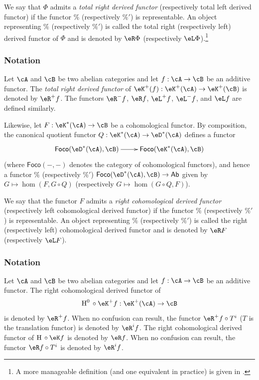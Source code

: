 \begin{definition}\label{VIII:4-1-2}
We say that $\Phi$ admits a \emph{total right derived functor}
(respectively total left derived functor) if the functor $\%$
(respectively $\%'$) is representable. An object representing $\%$
(respectively $\%'$) is called the total right (respectively left) derived
functor of $\Phi$ and is denoted by $\eR \Phi$ (respectively
$\eL \Phi$).\footnote{A more manageable definition (and one equivalent in
practice) is given in \cite[XVII 1.2]{sga4}.}
\end{definition}

\subsubsection{Notation}\label{VIII:4-1-3}

Let $\cA$ and $\cB$ be two abelian categories and let $f:\cA\to \cB$ be
an additive functor. The \emph{total right derived functor} of
$\eK^+(f):\eK^+(\cA) \to \eK^+(\cB)$ is denoted by $\eR^+ f$. The
functors $\eR^- f$, $\eR f$, $\eL^+ f$, $\eL^- f$, and $\eL f$ are
defined similarly.

Likewise, let $F:\eK^\ast(\cA) \to \cB$ be a cohomological functor.
By composition, the canonical quotient functor
$Q:\eK^\ast(\cA) \to \eD^\ast(\cA)$ defines a functor
\[\xymatrix{
  \mathsf{Foco}(\eD^\ast(\cA),\cB) \ar[r]
    & \mathsf{Foco}(\eK^\ast(\cA),\cB)
}\]
(where $\mathsf{Foco}(-,-)$ denotes the category of cohomological
functors), and hence a functor $\%$ (respectively $\%'$)
$\mathsf{Foco}(\eD^\ast(\cA),\cB) \to \mathsf{Ab}$ given by
$G\mapsto \hom(F,G\circ Q)$ (respectively
$G\mapsto \hom(G\circ Q,F)$).

\begin{definition}\label{VIII:4-1-4}
We say that the functor $F$ admits a \emph{right cohomological derived
functor} (respectively left cohomological derived functor) if the functor
$\%$ (respectively $\%'$) is representable. An object representing $\%$
(respectively $\%'$) is called the right (respectively left)
cohomological derived functor and is denoted by $\eR F$ (respectively
$\eL F$).
\end{definition}

\subsubsection{Notation}\label{VIII:4-1-5}

Let $\cA$ and $\cB$ be two abelian categories and let $f:\cA\to \cB$ be
an additive functor. The right cohomological derived functor of
\[
  \h^0{}\circ \eK^+ f:\eK^+(\cA) \to \cB
\]
is denoted by $\eR^+ f$. When no confusion can result, the functor
$\eR^+ f\circ T^i$ ($T$ is the translation functor) is denoted by
$\eR^i f$. The right cohomological derived functor of
$\h{}\circ \eK f$ is denoted by $\eR f$. When no confusion can result,
the functor $\eR f\circ T^i$ is denoted by $\eR^i f$.

